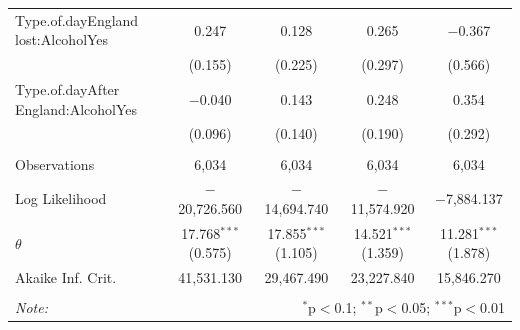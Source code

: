 \documentclass[12pt, letterpaper]{article}
\begin{document}
\begin{table}
{\begin{tabular}{@{\extracolsep{5pt}}lcccc}
  Type.of.dayEngland lost:AlcoholYes & 0.247 & 0.128 & 0.265 & $-$0.367 \\ 
  & (0.155) & (0.225) & (0.297) & (0.566) \\ 
  Type.of.dayAfter England:AlcoholYes & $-$0.040 & 0.143 & 0.248 & 0.354 \\ 
  & (0.096) & (0.140) & (0.190) & (0.292) \\ 
 \hline \\[-1.8ex] 
Observations & 6,034 & 6,034 & 6,034 & 6,034 \\ 
Log Likelihood & $-$20,726.560 & $-$14,694.740 & $-$11,574.920 & $-$7,884.137 \\ 
$\theta$ & 17.768$^{***}$  (0.575) & 17.855$^{***}$  (1.105) & 14.521$^{***}$  (1.359) & 11.281$^{***}$  (1.878) \\ 
Akaike Inf. Crit. & 41,531.130 & 29,467.490 & 23,227.840 & 15,846.270 \\ 
\hline 
\hline \\[-1.8ex] 
\textit{Note:}  & \multicolumn{4}{r}{$^{*}$p$<$0.1; $^{**}$p$<$0.05; $^{***}$p$<$0.01} \\ 
\end{tabular} 
 
  }
\end{table}

\clearpage
\printbibliography
\end{document}
